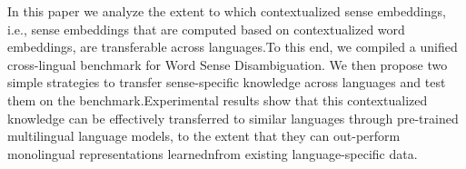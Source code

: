 In this paper we analyze the extent to which contextualized sense embeddings, i.e., sense embeddings that are computed based on contextualized word embeddings, are transferable across languages.To this end, we compiled a unified cross-lingual benchmark for Word Sense Disambiguation. We then propose two simple strategies to transfer sense-specific knowledge across languages and test them on the benchmark.Experimental results show that this contextualized knowledge can be effectively transferred to similar languages through pre-trained multilingual language models, to the extent that they can out-perform  monolingual representations learnednfrom existing language-specific data.

